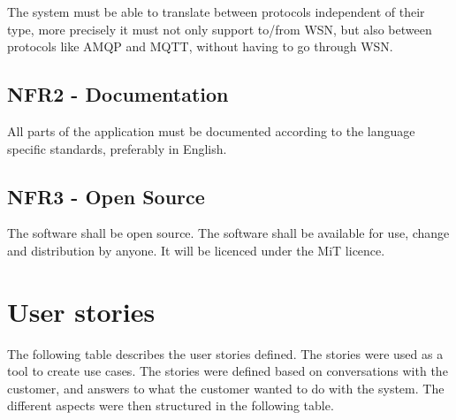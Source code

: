 The system must be able to translate between protocols independent of their type, more precisely it must not only support to/from WSN, but also between protocols like AMQP and MQTT, without having to go through WSN.

\subsection{NFR2 - Documentation}

All parts of the application must be documented according to the language specific standards, preferably in English.

\subsection{NFR3 - Open Source}

The software shall be open source. The software shall be available for use, change and distribution by anyone. It will be licenced under the MiT licence.

\section{User stories}

The following table describes the user stories defined. The stories were used as a tool to create use cases. The stories were defined based on conversations with the customer, and answers to what the customer wanted to do with the system. The different aspects were then structured in the following table.

\clearpage

